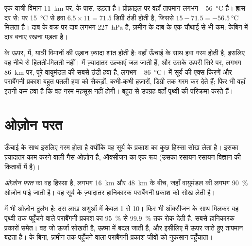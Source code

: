 \begin{example}[क्रूज़िंग ऊँचाई पर एक यात्री विमान]\label{ex:g8:the-atmosphere:airliner}
एक यात्री विमान \qty{11}{km} पर,  के पास, उड़ता है। प्रोफ़ाइल पर वहाँ तापमान
लगभग \qty{-56}{\degreeCelsius} है। ह्रास दर से:  पर
\qty{15}{\degreeCelsius} से हवा $6.5 \times 11 = 71.5$ डिग्री ठंडी होती है, जिससे
$15 - 71.5 =
\qty{-56.5}{\degreeCelsius}$ मिलता है। दाब के वक्र पर दाब लगभग
\qty{227}{hPa} है, ज़मीन के दाब के एक चौथाई से भी कम: केबिन में दाब बनाए रखना
पड़ता है।
\end{example}

 के ऊपर,  में, यात्री विमानों की उड़ान ज़्यादा शांत होती है: वहाँ
ऊँचाई के साथ हवा गरम होती है, इसलिए वह नीचे से हिलती-मिलती नहीं।  में
ज़्यादातर उल्काएँ जल जाती हैं, और उसके ऊपरी सिरे पर, लगभग \qty{86}{km} पर, पूरे
वायुमंडल की सबसे ठंडी हवा है, लगभग \qty{-86}{\degreeCelsius}।  में सूर्य की
एक्स-किरणें और पराबैंगनी प्रकाश बहुत पतली हवा को सैकड़ों, कभी-कभी हज़ारों, डिग्री तक
गरम कर देते हैं; फिर भी वहाँ इतनी कम हवा है कि वह गरम महसूस नहीं होगी। बहुत-से
उपग्रह वहाँ पृथ्वी की परिक्रमा करते हैं।

\section{ओज़ोन परत}

 ऊँचाई के साथ इसलिए गरम होता है क्योंकि वह सूर्य के प्रकाश का कुछ हिस्सा
सोख लेता है। इसका ज़्यादातर काम करने वाली गैस ओज़ोन है, ऑक्सीजन का एक रूप (उसका
रसायन रसायन विज्ञान की किताबों में है)।

\begin{definition}[ओज़ोन परत]\label{def:g8:the-atmosphere:ozone-layer}
\emph{ओज़ोन परत}  का वह हिस्सा है, लगभग \qty{16}{km}
और \qty{48}{km} के बीच, जहाँ वायुमंडल की लगभग 90~\% ओज़ोन पाई जाती है। वह सूर्य
के ज़्यादातर हानिकारक पराबैंगनी प्रकाश को सोख लेती
है।
\end{definition}

 में भी ओज़ोन दुर्लभ है: दस लाख अणुओं में केवल 1 से 10। फिर भी ऑक्सीजन के
साथ मिलकर वह पृथ्वी तक पहुँचने वाले पराबैंगनी प्रकाश का 95~\% से 99.9~\% तक रोक
देती है, सबसे हानिकारक प्रकारों समेत। वह जो ऊर्जा सोखती है, ऊष्मा में बदल जाती है,
और इसीलिए  में ऊपर जाते हुए तापमान बढ़ता है।  के बिना, ज़मीन तक
पहुँचने वाला पराबैंगनी प्रकाश जीवों को नुक़सान
पहुँचाता।

